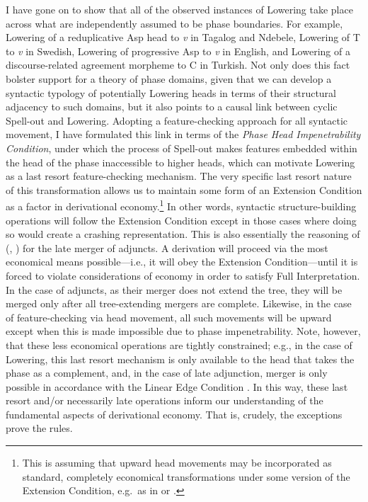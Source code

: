 I have gone on to show that all of the observed instances of Lowering take place across what are independently assumed to be phase boundaries. For example, Lowering of a reduplicative Asp head to {\it v} in Tagalog and Ndebele, Lowering of T to {\it v} in Swedish, Lowering of progressive Asp to {\it v} in English, and Lowering of a discourse-related agreement morpheme to C in Turkish. Not only does this fact bolster support for a theory of phase domains, given that we can develop a syntactic typology of potentially Lowering heads in terms of their structural adjacency to such domains, but it also points to a causal link between cyclic Spell-out and Lowering. Adopting a feature-checking approach for all syntactic movement, I have formulated this link in terms of the {\it Phase Head Impenetrability Condition}, under which the process of Spell-out makes features embedded within the head of the phase inaccessible to higher heads, which can motivate Lowering as a last resort feature-checking mechanism. The very specific last resort nature of this transformation allows us to maintain some form of an Extension Condition as a factor in derivational economy.\footnote{This is assuming that upward head movements may be incorporated as standard, completely economical transformations under some version of the Extension Condition, e.g.\ as in \citet{matushansky2006} or \citet{nissenbaum2000}.} In other words, syntactic structure-building operations will follow the Extension Condition except in those cases where doing so would create a crashing representation. This is also essentially the reasoning of \citeauthor{stepanov2000} (\citeyear{stepanov2000}, \citeyear{stepanov2001}) for the late merger of adjuncts. A derivation will proceed via the most economical means possible---i.e., it will obey the Extension Condition---until it is forced to violate considerations of economy in order to satisfy Full Interpretation. In the case of adjuncts, as their merger does not extend the tree, they will be merged only after all tree-extending mergers are complete. Likewise, in the case of feature-checking via head movement, all such movements will be upward except when this is made impossible due to phase impenetrability. Note, however, that these less economical operations are tightly constrained; e.g., in the case of Lowering, this last resort mechanism is only available to the head that takes the phase as a complement, and, in the case of late adjunction, merger is only possible in accordance with the Linear Edge Condition \citep{nissenbaum2000}. In this way, these last resort and/or necessarily late operations inform our understanding of the fundamental aspects of derivational economy. That is, crudely, the exceptions prove the rules.

